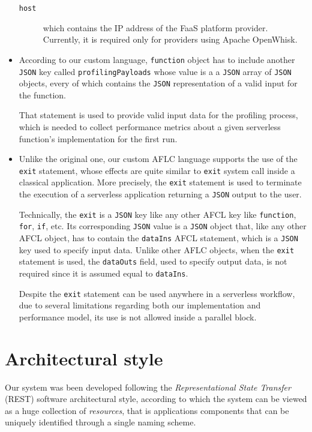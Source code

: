 \documentclass[12pt,a4paper]{report}
\begin{document}
\begin{itemize}
\begin{description}
		\item[\texttt{host}] which contains the IP address of the FaaS platform provider. Currently, it is required only for providers using Apache OpenWhisk.  
	\end{description}

	\item According to our custom language, \texttt{function} object has to include another \texttt{JSON} key called \texttt{profilingPayloads} whose value is a a \texttt{JSON} array of \texttt{JSON} objects, every of which contains the \texttt{JSON} representation of a valid input for the function.
	
	That statement is used to provide valid input data for the profiling process, which is needed to collect performance metrics about a given serverless function's implementation for the first run.
	
	\item Unlike the original one, our custom AFLC language supports the use of the \texttt{exit} statement, whose effects are quite similar to \texttt{exit} system call inside a classical application. More precisely, the \texttt{exit} statement is used to terminate the execution of a serverless application returning a \texttt{JSON} output to the user. 
	
	Technically, the \texttt{exit} is a \texttt{JSON} key like any other AFCL key like \texttt{function}, \texttt{for}, \texttt{if}, etc. Its corresponding \texttt{JSON} value is a \texttt{JSON} object that, like any other AFCL object\cite{AFCL}, has to contain the \texttt{dataIns} AFCL statement, which is a \texttt{JSON} key used to specify input data\cite{AFCL}. Unlike other AFLC objects, when the \texttt{exit} statement is used, the \texttt{dataOuts} field, used to specify output data\cite{AFCL}, is not required since it is assumed equal to \texttt{dataIns}.  
	
	Despite the \texttt{exit} statement can be used anywhere in a serverless workflow, due to several limitations regarding both our implementation and performance model, its use is not allowed inside a parallel block.
	
\end{itemize}

\section{Architectural style}

Our system was been developed following the \textit{Representational State Transfer} (REST) software architectural style, according to which the system can be viewed as a huge collection of \textit{resources}, that is applications components that can be uniquely identified through a single naming scheme. 
\end{document}
